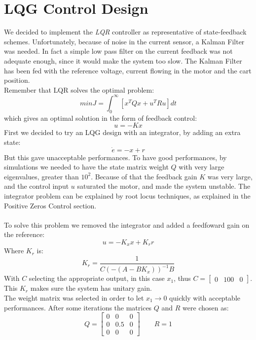 \section{LQG Control Design}
We decided to implement the \emph{LQR} controller as representative of state-feedback schemes. Unfortunately, because of noise in the current sensor, a Kalman Filter was needed. In fact a simple low pass filter on the current feedback was not adequate enough, since it would make the system too slow. The Kalman Filter has been fed with the reference voltage, current flowing in the motor and the cart position.\\

Remember that LQR solves the optimal problem:
\begin{equation}
min J = \int_0^{\infty} [x^T Q x + u^T R u] dt
\end{equation}
which gives an optimal solution in the form of feedback control:
\begin{equation}
u=-Kx
\end{equation}
First we decided to try an LQG design with an integrator, by adding an extra state: 
\begin{equation}
\dot{e} = -x+r
\end{equation}
But this gave unacceptable performances. To have good performances, by simulations we needed to have the state matrix weight $Q$ with very large eigenvalues, greater than $10^2$. Because of that the feedback gain $K$ was very large, and the control input $u$ saturated the motor, and made the system unstable. The integrator problem can be explained by root locus techniques, as explained in the Positive Zeros Control section. \\ \\
To solve this problem we removed the integrator and added a feedfoward gain on the reference:
\begin{equation}
u=-K_{x} x+ K_{r} r
\end{equation}
Where $K_{r}$ is:
\begin{equation}
K_{r} = \frac{1}{C(-(A-BK_x))^{-1}B}
\end{equation}
With $C$ selecting the appropriate output, in this case $x_1$, thus $C=\begin{bmatrix}0 & 100 & 0\end{bmatrix}$. This $K_r$ makes sure the system has unitary gain. \\
The weight matrix was selected in order to let $x_1 \to 0$ quickly with acceptable performances. After some iterations the matrices $Q$ and $R$ were chosen as:
\begin{equation}
Q = \begin{bmatrix}
0 & 0 & 0 \\ 0 & 0.5 & 0 \\ 0 & 0 &0 
\end{bmatrix}
\qquad
R=1
\end{equation}

